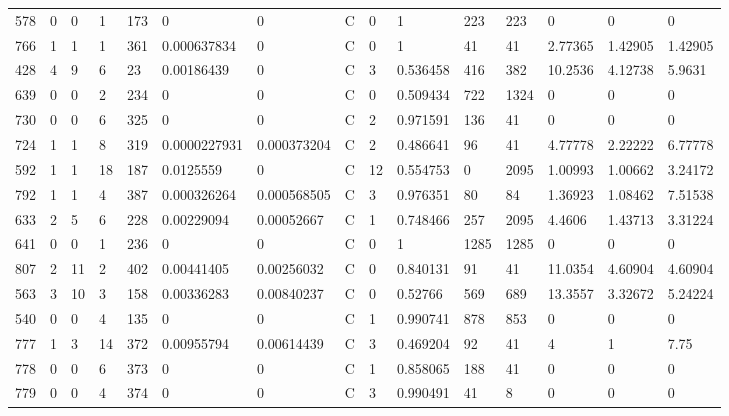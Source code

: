 \begin{latin}
\begin{longtable}{lllllllllllllll}
	578 & 0  & 0   & 1  & 173 & 0              & 0              & C & 0  & 1        & 223  & 223  & 0       & 0       & 0       \\
	766 & 1  & 1   & 1  & 361 & 0.000637834    & 0              & C & 0  & 1        & 41   & 41   & 2.77365 & 1.42905 & 1.42905 \\
	428 & 4  & 9   & 6  & 23  & 0.00186439     & 0              & C & 3  & 0.536458 & 416  & 382  & 10.2536 & 4.12738 & 5.9631  \\
	639 & 0  & 0   & 2  & 234 & 0              & 0              & C & 0  & 0.509434 & 722  & 1324 & 0       & 0       & 0       \\
	730 & 0  & 0   & 6  & 325 & 0              & 0              & C & 2  & 0.971591 & 136  & 41   & 0       & 0       & 0       \\
	724 & 1  & 1   & 8  & 319 & 0.0000227931   & 0.000373204    & C & 2  & 0.486641 & 96   & 41   & 4.77778 & 2.22222 & 6.77778 \\
	592 & 1  & 1   & 18 & 187 & 0.0125559      & 0              & C & 12 & 0.554753 & 0    & 2095 & 1.00993 & 1.00662 & 3.24172 \\
	792 & 1  & 1   & 4  & 387 & 0.000326264    & 0.000568505    & C & 3  & 0.976351 & 80   & 84   & 1.36923 & 1.08462 & 7.51538 \\
	633 & 2  & 5   & 6  & 228 & 0.00229094     & 0.00052667     & C & 1  & 0.748466 & 257  & 2095 & 4.4606  & 1.43713 & 3.31224 \\
	641 & 0  & 0   & 1  & 236 & 0              & 0              & C & 0  & 1        & 1285 & 1285 & 0       & 0       & 0       \\
	807 & 2  & 11  & 2  & 402 & 0.00441405     & 0.00256032     & C & 0  & 0.840131 & 91   & 41   & 11.0354 & 4.60904 & 4.60904 \\
	563 & 3  & 10  & 3  & 158 & 0.00336283     & 0.00840237     & C & 0  & 0.52766  & 569  & 689  & 13.3557 & 3.32672 & 5.24224 \\
	540 & 0  & 0   & 4  & 135 & 0              & 0              & C & 1  & 0.990741 & 878  & 853  & 0       & 0       & 0       \\
	777 & 1  & 3   & 14 & 372 & 0.00955794     & 0.00614439     & C & 3  & 0.469204 & 92   & 41   & 4       & 1       & 7.75    \\
	778 & 0  & 0   & 6  & 373 & 0              & 0              & C & 1  & 0.858065 & 188  & 41   & 0       & 0       & 0       \\
	779 & 0  & 0   & 4  & 374 & 0              & 0              & C & 3  & 0.990491 & 41   & 8    & 0       & 0       & 0       \\

\end{longtable}
\end{latin}
